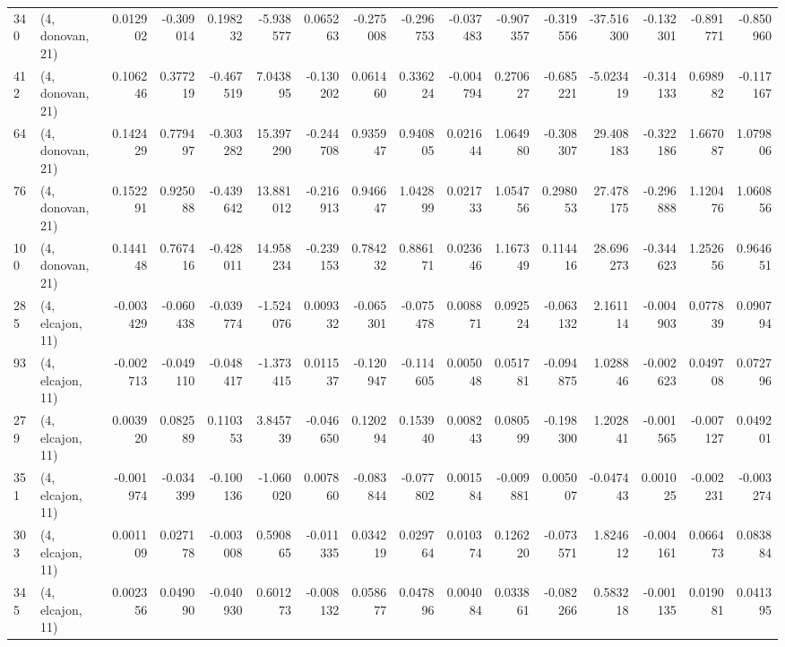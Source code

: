 \begin{tabular}{llrrrrrrrrrrrrrr}
340 &  (4, donovan, 21) &   0.012902 & -0.309014 &  0.198232 &   -5.938577 &  0.065263 &  -0.275008 & -0.296753 & -0.037483 & -0.907357 & -0.319556 &   -37.516300 & -0.132301 & -0.891771 & -0.850960 \\
412 &  (4, donovan, 21) &   0.106246 &  0.377219 & -0.467519 &    7.043895 & -0.130202 &   0.061460 &  0.336224 & -0.004794 &  0.270627 & -0.685221 &    -5.023419 & -0.314133 &  0.698982 & -0.117167 \\
64  &  (4, donovan, 21) &   0.142429 &  0.779497 & -0.303282 &   15.397290 & -0.244708 &   0.935947 &  0.940805 &  0.021644 &  1.064980 & -0.308307 &    29.408183 & -0.322186 &  1.667087 &  1.079806 \\
76  &  (4, donovan, 21) &   0.152291 &  0.925088 & -0.439642 &   13.881012 & -0.216913 &   0.946647 &  1.042899 &  0.021733 &  1.054756 &  0.298053 &    27.478175 & -0.296888 &  1.120476 &  1.060856 \\
100 &  (4, donovan, 21) &   0.144148 &  0.767416 & -0.428011 &   14.958234 & -0.239153 &   0.784232 &  0.886171 &  0.023646 &  1.167349 &  0.114416 &    28.696273 & -0.344623 &  1.252656 &  0.964651 \\
285 &  (4, elcajon, 11) &  -0.003429 & -0.060438 & -0.039774 &   -1.524076 &  0.009332 &  -0.065301 & -0.075478 &  0.008871 &  0.092524 & -0.063132 &     2.161114 & -0.004903 &  0.077839 &  0.090794 \\
93  &  (4, elcajon, 11) &  -0.002713 & -0.049110 & -0.048417 &   -1.373415 &  0.011537 &  -0.120947 & -0.114605 &  0.005048 &  0.051781 & -0.094875 &     1.028846 & -0.002623 &  0.049708 &  0.072796 \\
279 &  (4, elcajon, 11) &   0.003920 &  0.082589 &  0.110353 &    3.845739 & -0.046650 &   0.120294 &  0.153940 &  0.008243 &  0.080599 & -0.198300 &     1.202841 & -0.001565 & -0.007127 &  0.049201 \\
351 &  (4, elcajon, 11) &  -0.001974 & -0.034399 & -0.100136 &   -1.060020 &  0.007860 &  -0.083844 & -0.077802 &  0.001584 & -0.009881 &  0.005007 &    -0.047443 &  0.001025 & -0.002231 & -0.003274 \\
303 &  (4, elcajon, 11) &   0.001109 &  0.027178 & -0.003008 &    0.590865 & -0.011335 &   0.034219 &  0.029764 &  0.010374 &  0.126220 & -0.073571 &     1.824612 & -0.004161 &  0.066473 &  0.083884 \\
345 &  (4, elcajon, 11) &   0.002356 &  0.049090 & -0.040930 &    0.601273 & -0.008132 &   0.058677 &  0.047896 &  0.004084 &  0.033861 & -0.082266 &     0.583218 & -0.001135 &  0.019081 &  0.041395 \\

\end{tabular}
